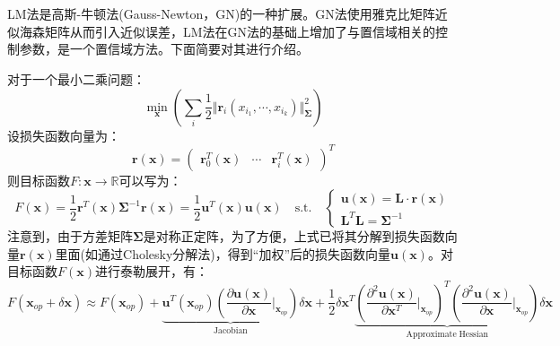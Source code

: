 \chapter{}

\section{}
\label{appendix:lm_alg}
LM法是高斯-牛顿法(Gauss-Newton，GN)的一种扩展。GN法使用雅克比矩阵近似海森矩阵从而引入近似误差，LM法在GN法的基础上增加了与置信域相关的控制参数，是一个置信域方法\cite{dellaert2017factor}。下面简要对其进行介绍。

对于一个最小二乘问题：
\begin{equation}
  \min_{\boldsymbol{x}}\left( \sum_{i}\frac{1}{2}\Vert \boldsymbol{r}_i(x_{i_1},\cdots,x_{i_k}) \Vert^2_{\boldsymbol{\Sigma}}\right)
\end{equation}
设损失函数向量为：
\begin{equation}
  \boldsymbol{r(\boldsymbol{x})}=\begin{pmatrix}
    \boldsymbol{r}_0^T(\boldsymbol{x}) &
    \cdots                             &
    \boldsymbol{r}_i^T(\boldsymbol{x})
  \end{pmatrix}^T
\end{equation}
则目标函数$F:\boldsymbol{x}\to\mathbb{R}$可以写为：
\begin{equation}
  F(\boldsymbol{x})=\frac{1}{2}\boldsymbol{r}^T(\boldsymbol{x})\boldsymbol{\Sigma}^{-1}\boldsymbol{r}(\boldsymbol{x})=\frac{1}{2}\boldsymbol{u}^T(\boldsymbol{x})\boldsymbol{u}(\boldsymbol{x})\quad \mathrm{s.t.}\quad\begin{cases}
    \boldsymbol{u}(\boldsymbol{x})=\boldsymbol{L}\cdot\boldsymbol{r}(\boldsymbol{x}) \\
    \boldsymbol{L}^T\boldsymbol{L}=\boldsymbol{\Sigma}^{-1}
  \end{cases}
\end{equation}
注意到，由于方差矩阵$\boldsymbol{\Sigma}$是对称正定阵，为了方便，上式已将其分解到损失函数向量$\boldsymbol{r}(\boldsymbol{x})$里面(如通过Cholesky分解法)，得到“加权”后的损失函数向量$\boldsymbol{u}(\boldsymbol{x})$。对目标函数$F(\boldsymbol{x})$进行泰勒展开，有：
\begin{equation}
  \label{equ:taler}
  F(\boldsymbol{x}_{op}+\delta\boldsymbol{x})\approx F(\boldsymbol{x}_{op})+ \underbrace{ \boldsymbol{u}^T(\boldsymbol{x}_{op})\left(\frac{\partial \boldsymbol{u}(\boldsymbol{x})}{\partial \boldsymbol{x}} \bigg|_{\boldsymbol{x}_{op}}  \right) }_{\mathrm{Jacobian}} \delta\boldsymbol{x}+\frac{1}{2}\delta\boldsymbol{x}^T\underbrace{
    \left( \frac{\partial^2 \boldsymbol{u}(\boldsymbol{x})}{\partial \boldsymbol{x}^T}\bigg|_{\boldsymbol{x}_{op}}\right)^T
    \left( \frac{\partial^2 \boldsymbol{u}(\boldsymbol{x})}{\partial \boldsymbol{x}}\bigg|_{\boldsymbol{x}_{op}}\right)
  }_{\mathrm{Approximate\;Hessian}} \delta\boldsymbol{x}
\end{equation}
